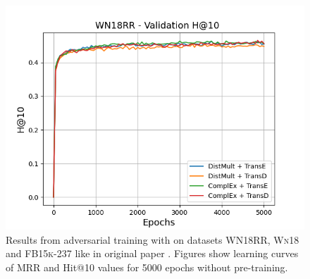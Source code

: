 \begin{figure}
\begin{minipage}{.3\textwidth}
      \includegraphics[width=\linewidth]{figures/results/gan_train/not_pretrained/random/wn18rr/epochs5000/random_wn18rr_hit10.png}
    \end{minipage}%
    \caption{Results from adversarial training with \origsampling on datasets \textsc{WN18RR}, \textsc{Wn18} and \textsc{FB15k-237} like in original \kbgan paper \cite{cai2017kbgan}.
    Figures show learning curves of MRR and Hit@10 values for 5000 epochs without pre-training.}
    \label{fig:gan_train_not_pretrained_random}
\end{figure}
